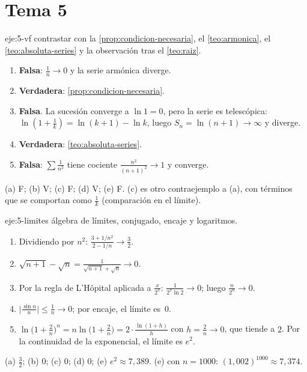 \section{Tema 5}

\begin{solucion}{eje:5-vf}
\planteamiento contrastar con la \cref{prop:condicion-necesaria}, el \cref{teo:armonica}, el \cref{teo:absoluta-series} y la observación tras el \cref{teo:raiz}.
\pasos
\begin{enumerate}[label=(\alph*)]
  \item \textbf{Falsa}: $\frac1n\to0$ y la serie armónica diverge.
  \item \textbf{Verdadera}: \cref{prop:condicion-necesaria}.
  \item \textbf{Falsa}. La sucesión converge a $\ln1=0$, pero la serie es telescópica: $\ln(1+\frac1k)=\ln(k+1)-\ln k$, luego $S_n=\ln(n+1)\to\infty$ y diverge.
  \item \textbf{Verdadera}: \cref{teo:absoluta-series}.
  \item \textbf{Falsa}: $\sum\frac{1}{n^{2}}$ tiene cociente $\frac{n^{2}}{(n+1)^{2}}\to1$ y converge.
\end{enumerate}
\resultado (a) F; (b) V; (c) F; (d) V; (e) F.
\comprobacion (c) es otro contraejemplo a (a), con términos que se comportan como $\frac1k$ (comparación en el límite).
\end{solucion}

\begin{solucion}{eje:5-limites}
\planteamiento álgebra de límites, conjugado, encaje y logaritmos.
\pasos
\begin{enumerate}[label=(\alph*)]
  \item Dividiendo por $n^{2}$: $\frac{3+1/n^{2}}{2-1/n}\to\frac32$.
  \item $\sqrt{n+1}-\sqrt n=\frac{1}{\sqrt{n+1}+\sqrt n}\to0$.
  \item Por la regla de L'Hôpital aplicada a $\frac{x}{2^{x}}$: $\frac{1}{2^{x}\ln2}\to0$; luego $\frac{n}{2^{n}}\to0$.
  \item $\bigl|\frac{\sin n}{n}\bigr|\le\frac1n\to0$; por encaje, el límite es~$0$.
  \item $\ln\bigl(1+\frac2n\bigr)^{n}=n\ln\bigl(1+\frac2n\bigr)=2\cdot\frac{\ln(1+h)}{h}$ con $h=\frac2n\to0$, que tiende a $2$. Por la continuidad de la exponencial, el límite es $e^{2}$.
\end{enumerate}
\resultado (a) $\frac32$; (b) $0$; (c) $0$; (d) $0$; (e) $e^{2}\approx7{,}389$.
\comprobacion (e) con $n=1000$: $(1{,}002)^{1000}\approx7{,}374$.
\end{solucion}

